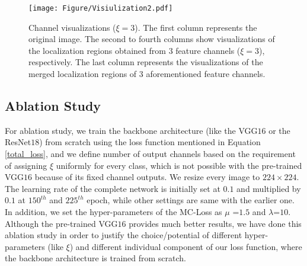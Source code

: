 \documentclass[journal]{IEEEtran}
\begin{document}
\begin{figure*}[!t]
    \begin{center}
\texttt{[image: Figure/Visiulization2.pdf]}

\end{center}
    \vspace{-5mm}
    \caption{Channel visualizations ($\xi=3$).  The first column represents the original image. The second to fourth columns show visualizations of the localization regions obtained from $3$ feature channels ($\xi=3$), respectively. The last column represents the visualizations of the merged localization regions of $3$ aforementioned feature channels.}
    \label{fig:visualization_MC}
      \vspace{-5mm}
\end{figure*}




\subsection{Ablation Study}\label{Ablation}

For ablation study, we train the backbone architecture (like the VGG$16$ or the ResNet$18$) from scratch using the loss function mentioned in Equation \ref{total_loss}, and we define number of output channels based on the requirement of assigning $\xi$ uniformly for every class, which is not possible with the pre-trained VGG$16$ because of its fixed channel outputs. We resize every image to $224\times224$. The learning rate of the complete network is initially set at $0.1$ and multiplied by $0.1$ at $150^{th}$ and $225^{th}$ epoch, while other settings are same with the earlier one. In addition, we set the hyper-parameters of the MC-Loss as $\mu$ =$1.5$ and $\lambda$=$10$. Although the  pre-trained VGG$16$ provides much better results, we have done this ablation study in order to justify the choice/potential of different hyper-parameters (like $\xi$) and different individual component of our loss function, where the backbone architecture is trained from scratch. 

 
\end{document}

